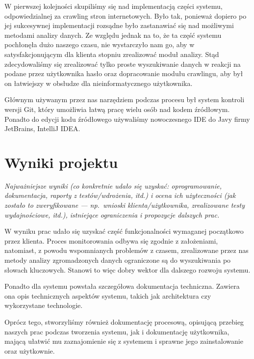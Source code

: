\documentclass[polish,12pt]{aghthesis}
\begin{document}
W pierwszej kolejności skupiliśmy się nad implementacją części systemu, odpowiedzialnej za crawling stron internetowych. Było tak, ponieważ
dopiero po jej sukcesywnej implementacji rozsądne było zastanawiać się nad możliwymi metodami analizy danych. Ze względu jednak na to, że 
ta część systemu pochłonęła dużo naszego czasu, nie wystarczyło nam go, aby w satysfakcjonującym dla klienta stopniu zrealizować moduł analizy.
Stąd zdecydowaliśmy się zrealizować tylko proste wyszukiwanie danych w reakcji na podane przez użytkownika hasło oraz dopracowanie modułu crawlingu,
aby był on łatwiejszy w obsłudze dla nieinformatycznego użytkownika. 

Głównym używanym przez nas narzędziem podczas procesu był system kontroli wersji Git, który umożliwia łatwą pracę wielu osób nad kodem źródłowym.
Ponadto do edycji kodu źródłowego używaliśmy nowoczesnego IDE do Javy firmy JetBrains, IntelliJ IDEA.

\section{Wyniki projektu}

\label{sec:wyniki-projektu}

\emph{Najważniejsze wyniki (co konkretnie udało się uzyskać:
  oprogramowanie, dokumentacja, raporty z testów/wdrożenia, itd.)
  i ocena ich użyteczności (jak zostało to zweryfikowane --- np.\ wnioski
  klienta/użytkownika, zrealizowane testy wydajnościowe, itd.),
  istniejące ograniczenia i propozycje dalszych prac.}

W wyniku prac udało się uzyskać część funkcjonalności
wymaganej początkowo przez klienta. Proces monitorowania odbywa się zgodnie z założeniami,
natomiast, z powodu wspomnianych problemów z czasem, zrealizowane przez nas metody analizy
zgromadzonych danych ograniczone są do wyszukiwania po słowach kluczowych. Stanowi
to więc dobry wektor dla dalszego rozwoju systemu.

Ponadto dla systemu powstała szczegółowa dokumentacja techniczna. Zawiera ona opis
technicznych aspektów systemu, takich jak architektura czy wykorzystane technologie.

Oprócz tego, stworzyliśmy również dokumentację procesową, opisującą przebieg naszych
prac podczas tworzenia systemu, jak i dokumentację użytkownika, mającą ułatwić mu 
zaznajomienie się z systemem i sprawne jego zainstalowanie oraz użytkownie. 


\nocite{artykul2011,ksiazka2011,narzedzie2011,projekt2011}


\end{document}
